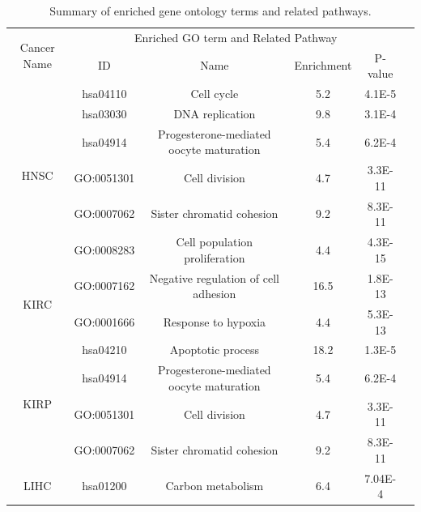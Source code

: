\begin{table}[h!]
   \caption{Summary of enriched gene ontology terms and related pathways.} 
   \label{tab:goTab}
   \begin{adjustbox}{max width=\textwidth}
   \centering %
\begin{tabular}{|c|c|c| c c c |c|c|}
        \hline
        \multirow{2}{*}{Cancer Name}  & \multicolumn{6}{c|}{Enriched GO term and Related Pathway}\\
         \cline{2-7}
                                      & ID & \multicolumn{3}{c|}{Name} & Enrichment & P-value\\
        \hline
        \multirow{6}{*}{HNSC} & hsa04110 & \multicolumn{3}{c|}{Cell cycle} & 5.2 & 4.1E-5\\
                              & hsa03030 & \multicolumn{3}{c|}{DNA replication} & 9.8 & 3.1E-4\\
                              & hsa04914 & \multicolumn{3}{c|}{Progesterone-mediated oocyte maturation} & 5.4 & 6.2E-4\\
                              & GO:0051301 & \multicolumn{3}{c|}{Cell division} & 4.7 & 3.3E-11\\
                              & GO:0007062 & \multicolumn{3}{c|}{Sister chromatid cohesion} & 9.2 & 8.3E-11\\
                              & GO:0008283 & \multicolumn{3}{c|}{Cell population proliferation} & 4.4 & 4.3E-15\\
        \hline
        \multirow{2}{*}{KIRC} & GO:0007162 & \multicolumn{3}{c|}{Negative regulation of cell adhesion} & 16.5 & 1.8E-13\\
                              & GO:0001666 & \multicolumn{3}{c|}{Response to hypoxia} & 4.4 & 5.3E-13\\
        \hline
        \multirow{4}{*}{KIRP} & hsa04210 & \multicolumn{3}{c|}{Apoptotic process} & 18.2 & 1.3E-5\\
                              & hsa04914 & \multicolumn{3}{c|}{Progesterone-mediated oocyte maturation} & 5.4 & 6.2E-4\\
                              & GO:0051301 & \multicolumn{3}{c|}{Cell division} & 4.7 & 3.3E-11\\
                              & GO:0007062 & \multicolumn{3}{c|}{Sister chromatid cohesion} & 9.2 & 8.3E-11\\
        \hline
        \multirow{4}{*}{LIHC} & hsa01200 & \multicolumn{3}{c|}{Carbon metabolism} & 6.4 & 7.04E-4\\

\end{tabular}
\end{adjustbox}
\end{table}
